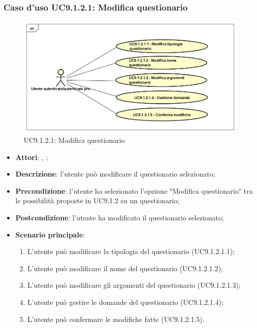			\subsubsection{Caso d'uso UC9.1.2.1: Modifica questionario}
			\label{UC9.1.2.1}
			\begin{figure}[h]
				\centering
			\includegraphics[scale=0.5,keepaspectratio]{UML/UC9_1_2_1.png}
				\caption{UC9.1.2.1: Modifica questionario}
			\end{figure}
			\FloatBarrier
			\begin{itemize}
				\item \textbf{Attori}: \uau, \uaupro;
				\item \textbf{Descrizione}: l'utente può modificare il questionario selezionato;
				\item \textbf{Precondizione}: l'utente ha selezionato l'opzione "Modifica questionario" tra le possibilità proposte in UC9.1.2 su un questionario;
				\item \textbf{Postcondizione}: l'utente ha modificato il questionario selezionato; 
				\item \textbf{Scenario principale}:
					\begin{enumerate}
						\item L'utente può modificare la tipologia del questionario (UC9.1.2.1.1);
						\item L'utente può modificare il nome del questionario (UC9.1.2.1.2);
						\item L'utente può modificare gli argomenti del questionario (UC9.1.2.1.3);
						\item L'utente può gestire le domande del questionario (UC9.1.2.1.4);
						\item L'utente può confermare le modifiche fatte (UC9.1.2.1.5).
					\end{enumerate}
			\end{itemize}
			
